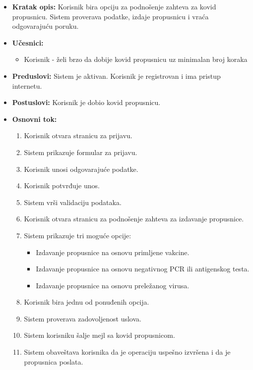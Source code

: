 \documentclass[titlepage]{article}
\begin{document}
\begin{itemize}
    \item \textbf{Kratak opis:} Korisnik bira opciju za podnošenje zahteva za kovid propusnicu. Sistem proverava podatke, izdaje propusnicu i vraća odgovarajuću poruku.
    \item \textbf{Učesnici:}
        \begin{itemize}
            \item Korisnik - želi brzo da dobije kovid propusnicu uz minimalan broj koraka
        \end{itemize}
    \item \textbf{Preduslovi:} Sistem je aktivan. Korisnik je registrovan i ima pristup internetu.
    \item \textbf{Postuslovi:} Korisnik je dobio kovid propusnicu.
    \item \textbf{Osnovni tok:}
        \begin{enumerate}
            \item Korisnik otvara stranicu za prijavu.
            \item Sistem prikazuje formular za prijavu.
            \item Korisnik unosi odgovarajuće podatke.
            \item Korisnik potvrđuje unos.
            \item Sistem vrši validaciju podataka.
            \item Korisnik otvara stranicu za podnošenje zahteva za izdavanje propusnice.
            \item Sistem prikazuje tri moguće opcije:
                \begin{itemize}
                    \item Izdavanje propusnice na osnovu primljene vakcine.
                    \item Izdavanje propusnice na osnovu negativnog PCR ili antigenskog testa.
                    \item Izdavanje propusnice na osnovu preležanog virusa.
                \end{itemize}
            \item Korisnik bira jednu od ponuđenih opcija.
            \item Sistem proverava zadovoljenost uslova.
            \item Sistem korisniku šalje mejl sa kovid propusnicom.
            \item Sistem obaveštava korisnika da je operaciju uspešno izvršena i da je propusnica poslata.
        \end{enumerate}
     

\end{itemize}
\end{document}
